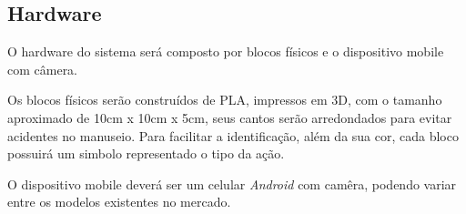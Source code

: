     \subsection{Hardware}
    O hardware do sistema será composto por blocos físicos e o dispositivo mobile com câmera.
    
    Os blocos físicos serão construídos de PLA, impressos em 3D, com o tamanho aproximado de 10cm x 10cm x 5cm, seus cantos serão arredondados para evitar acidentes no manuseio. Para facilitar a identificação, além da sua cor, cada bloco possuirá um simbolo representado o tipo da ação.
    
    O dispositivo mobile deverá ser um celular \textit{Android} com camêra, podendo variar entre os modelos existentes no mercado.
    

